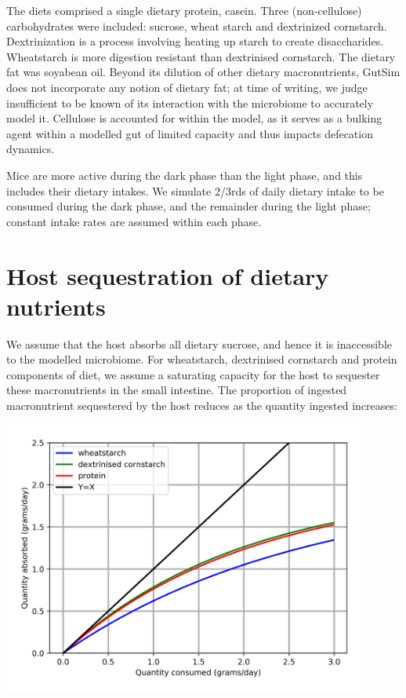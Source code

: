 \documentclass{article}
\begin{document}
The diets comprised a single dietary protein, casein. 
Three (non-cellulose) carbohydrates were included: sucrose, wheat starch and dextrinized cornstarch. 
Dextrinization is a process involving heating up starch to create disaccharides. 
Wheatstarch is more digestion resistant than dextrinised cornstarch. 
The dietary fat was soyabean oil. 
Beyond its dilution of other dietary macronutrients, GutSim does not incorporate any notion of dietary fat; at time of writing, we judge insufficient to be known of its interaction with the microbiome to accurately model it.
Cellulose is accounted for within the model, as it serves as a bulking agent within a modelled gut of limited capacity and thus impacts defecation dynamics.  

Mice are more active during the dark phase than the light phase, and this includes their dietary intakes.
We simulate 2/3rds of daily dietary intake to be consumed during the dark phase, and the remainder during the light phase; constant intake rates are assumed within each phase.

\section{Host sequestration of dietary nutrients}

We assume that the host absorbs all dietary sucrose, and hence it is inaccessible to the modelled microbiome. 
For wheatstarch, dextrinised cornstarch and protein components of diet, we assume a saturating capacity for the host to sequester these macronutrients in the small intestine. 
The proportion of ingested macronutrient sequestered by the host reduces as the quantity ingested increases:

\begin{center}
\includegraphics[width=12cm]{../probability-curves/si_absorbed.png}
\end{center}
\end{document}
